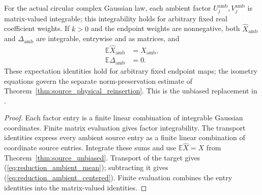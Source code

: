 \begin{theorem}
    \label{thm:reduction_ambient_unbiased}
    \leanok
    For the actual circular complex Gaussian law, each ambient factor
    $U_j^{\mathrm{amb}},V_j^{\mathrm{amb}}$ is matrix-valued integrable;
    this integrability holds for arbitrary fixed real coefficient weights.
    If $k>0$ and the endpoint weights are nonnegative,
    both $\widehat X_{\mathrm{amb}}$ and $\Delta_{\mathrm{amb}}$ are
    integrable, entrywise and as matrices, and
    \begin{align}
        \mathbb E\widehat X_{\mathrm{amb}} & =X_{\mathrm{amb}},
        \label{eq:reduction_ambient_mean}                       \\
        \mathbb E\Delta_{\mathrm{amb}}     & =0.
        \label{eq:reduction_ambient_centered}
    \end{align}
    These expectation identities hold for arbitrary fixed endpoint maps;
    the isometry equations govern the separate norm-preservation estimate
    of Theorem~\ref{thm:source_physical_reinsertion}.
    This is the unbiased replacement in
    \cite[Equation~(5.6)]{OpenAI2026PolynomialPEPS}.
\end{theorem}

\begin{proof}\leanok
    Each factor entry is a finite linear combination of integrable
    Gaussian coordinates. Finite matrix evaluation gives factor
    integrability. The transport identities express every ambient source
    entry as a finite linear combination of coordinate source entries.
    Integrate these sums and use $\mathbb E\widehat X=X$ from
    Theorem~\ref{thm:source_unbiased}. Transport of the target gives
    (\ref{eq:reduction_ambient_mean}); subtracting it gives
    (\ref{eq:reduction_ambient_centered}). Finite evaluation combines the
    entry identities into the matrix-valued identities.
\end{proof}

